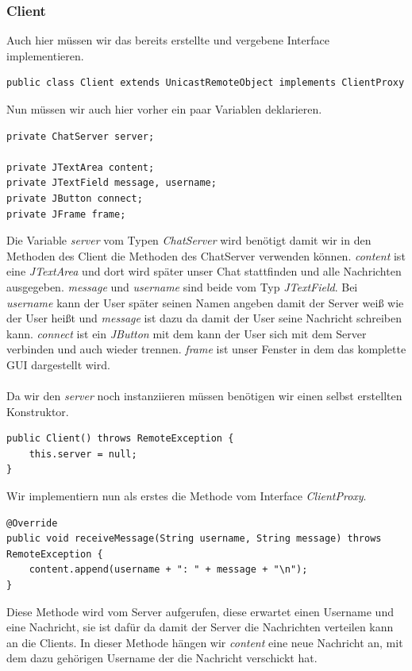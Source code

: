 \subsubsection{Client}
Auch hier müssen wir das bereits erstellte und vergebene Interface implementieren.
\begin{lstlisting}
public class Client extends UnicastRemoteObject implements ClientProxy
\end{lstlisting}
Nun müssen wir auch hier vorher ein paar Variablen deklarieren.
\begin{lstlisting}
private ChatServer server;

private JTextArea content;
private JTextField message, username;
private JButton connect;
private JFrame frame;
\end{lstlisting}
Die Variable \textit{server} vom Typen \textit{ChatServer} wird benötigt damit wir in den Methoden des Client die Methoden des ChatServer verwenden können. \textit{content} ist eine \textit{JTextArea} und dort wird später unser Chat stattfinden und alle Nachrichten ausgegeben. \textit{message} und \textit{username} sind beide vom Typ \textit{JTextField}. Bei \textit{username} kann der User später seinen Namen angeben damit der Server weiß wie der User heißt und \textit{message} ist dazu da damit der User seine Nachricht schreiben kann. \textit{connect} ist ein \textit{JButton} mit dem kann der User sich mit dem Server verbinden und auch wieder trennen. \textit{frame} ist unser Fenster in dem das komplette GUI dargestellt wird.\\\\Da wir den \textit{server} noch instanziieren müssen benötigen wir einen selbst erstellten Konstruktor.
\begin{lstlisting}
public Client() throws RemoteException {
	this.server = null;
}
\end{lstlisting}


Wir implementiern nun als erstes die Methode vom Interface \textit{ClientProxy}. 
\begin{lstlisting}
@Override
public void receiveMessage(String username, String message) throws RemoteException {
	content.append(username + ": " + message + "\n");
}
\end{lstlisting}
Diese Methode wird vom Server aufgerufen, diese erwartet einen Username und eine Nachricht, sie ist dafür da damit der Server die Nachrichten verteilen kann an die Clients. In dieser Methode hängen wir \textit{content} eine neue Nachricht an, mit dem dazu gehörigen Username der die Nachricht verschickt hat. 

